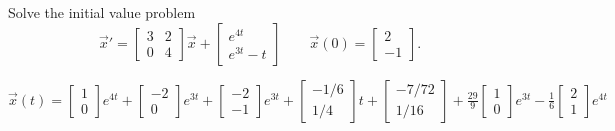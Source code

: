 \begin{exercise}
Solve the initial value problem
\[ {\vec{x}}' = \begin{bmatrix} 3 & 2 \\ 0 & 4 \end{bmatrix}\vec{x} + \begin{bmatrix} e^{4t} \\ e^{3t} - t \end{bmatrix} \qquad \vec{x}(0) = \begin{bmatrix} 2 \\ -1 \end{bmatrix}. \]
\end{exercise}
\comboSol{%
}
{%
$\vec{x}(t) = \left[\begin{smallmatrix} 1 \\ 0 \end{smallmatrix}\right]e^{4t} + \left[\begin{smallmatrix} -2 \\ 0 \end{smallmatrix}\right]e^{3t} + \left[\begin{smallmatrix} -2 \\ -1 \end{smallmatrix}\right]e^{3t} + \left[\begin{smallmatrix} -1/6 \\ 1/4 \end{smallmatrix}\right]t + \left[\begin{smallmatrix} -7/72\\ 1/16 \end{smallmatrix}\right] + \frac{29}{9}\left[\begin{smallmatrix}  1 \\ 0 \end{smallmatrix}\right]e^{3t} - \frac{1}{6}\left[\begin{smallmatrix} 2 \\ 1 \end{smallmatrix}\right]e^{4t}$
}

